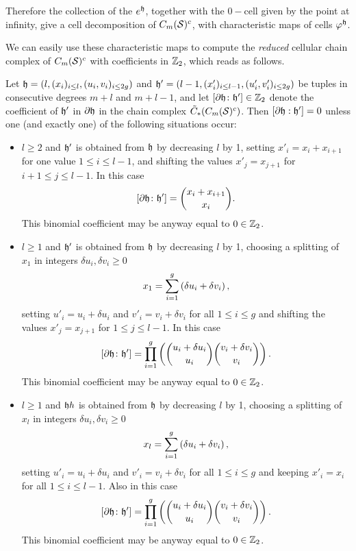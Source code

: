 Therefore the collection of the $e^{\mathfrak{h}}$, together with the $0-$cell given by the point at infinity,
give a cell decomposition of $C_m(\mathcal{S})^c$, with characteristic maps of cells $\varphi^{\mathfrak{h}}$.

We can easily use these characteristic maps to compute the \emph{reduced} cellular chain complex of $C_m(\mathcal{S})^c$
with coefficients in $\mathbb{Z}_2$, which
reads as follows.
\begin{lem}
\label{lem:doperatoropenmodtwo}
Let $\mathfrak{h}=(l,(x_i)_{i\leq l},(u_i,v_i)_{i\leq 2g})$ and
$\mathfrak{h}'=(l-1,(x'_i)_{i\leq l-1},(u'_i,v'_i)_{i\leq 2g})$
be tuples in consecutive degrees $m+l$ and $m+l-1$, and let $[\partial \mathfrak{h}\colon\mathfrak{h}']\in\mathbb{Z}_2$ denote the coefficient
of $\mathfrak{h}'$ in $\partial \mathfrak{h}$ in the chain complex $\tilde{C}_*(C_m(\mathcal{S})^c)$.
Then $[\partial \mathfrak{h}:\mathfrak{h}']=0$ unless one (and exactly one) of the following situations occur:
\begin{itemize}
 \item $l\geq 2$ and $\mathfrak{h}'$ is obtained from $\mathfrak{h}$ by decreasing $l$ by 1, setting $x'_i=x_i+x_{i+1}$
 for one value $1\leq i\leq l-1$, and shifting the values
 $x'_j=x_{j+1}$ for $i+1\leq j\leq l-1$. In this case
 \[
  [\partial \mathfrak{h}\colon\mathfrak{h}']=\binom{x_i+x_{i+1}}{x_i}.
 \]
 This binomial coefficient may be anyway equal to $0\in\mathbb{Z}_2$.
 \item $l\geq 1$ and $\mathfrak{h}'$ is obtained from $\mathfrak{h}$ by decreasing $l$ by 1, choosing a splitting of $x_1$
 in integers $\delta u_i,\delta v_i\geq 0$
 \[
  x_1=\sum_{i=1}^g \left(\delta u_i+\delta v_i\right),
 \]
 setting $u'_i=u_i+\delta u_i$ and $v'_i=v_i+\delta v_i$ for all $1\leq i\leq g$ and shifting the values
 $x'_j=x_{j+1}$ for $1\leq j\leq l-1$. In this case
 \[
  [\partial \mathfrak{h}\colon\mathfrak{h}']=\prod_{i=1}^g\left(\binom{u_i+\delta u_i}{u_i}\binom{v_i+\delta v_i}{v_i}\right).
 \]
 This binomial coefficient may be anyway equal to $0\in\mathbb{Z}_2$.
 \item $l\geq 1$ and $\mathfrak{h} h$ is obtained from $\mathfrak{h}$ by decreasing $l$ by 1, choosing a splitting of $x_l$
 in integers $\delta u_i,\delta v_i\geq 0$
 \[
  x_l=\sum_{i=1}^g \left(\delta u_i+\delta v_i\right),
 \]
 setting $u'_i=u_i+\delta u_i$ and $v'_i=v_i+\delta v_i$ for all $1\leq i\leq g$ and keeping $x'_i=x_i$ for all $1\leq i\leq l-1$.
 Also in this case
 \[
  [\partial \mathfrak{h}\colon\mathfrak{h}']=\prod_{i=1}^g\left(\binom{u_i+\delta u_i}{u_i}\binom{v_i+\delta v_i}{v_i}\right).
 \]
 This binomial coefficient may be anyway equal to $0\in\mathbb{Z}_2$.
\end{itemize}
\end{lem}
